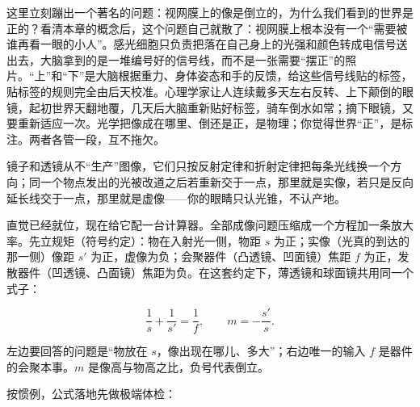\begin{mainline}
这里立刻蹦出一个著名的问题：视网膜上的像是倒立的，为什么我们看到的世界是正的？看清本章的概念后，这个问题自己就散了：视网膜上根本没有一个“需要被谁再看一眼的小人”。感光细胞只负责把落在自己身上的光强和颜色转成电信号送出去，大脑拿到的是一堆编号好的信号线，而不是一张需要“摆正”的照片。“上”和“下”是大脑根据重力、身体姿态和手的反馈，给这些信号线贴的标签，贴标签的规则完全由后天校准。心理学家让人连续戴多天左右反转、上下颠倒的眼镜，起初世界天翻地覆，几天后大脑重新贴好标签，骑车倒水如常；摘下眼镜，又要重新适应一次。光学把像成在哪里、倒还是正，是物理；你觉得世界“正”，是标注。两者各管一段，互不拖欠。

\end{mainline}

\begin{mainline}


\begin{oneline}
镜子和透镜从不“生产”图像，它们只按反射定律和折射定律把每条光线换一个方向；同一个物点发出的光被改道之后若重新交于一点，那里就是实像，若只是反向延长线交于一点，那里就是虚像——你的眼睛只认光锥，不认产地。
\end{oneline}


直觉已经就位，现在给它配一台计算器。全部成像问题压缩成一个方程加一条放大率。先立规矩（符号约定）：物在入射光一侧，物距 $s$ 为正；实像（光真的到达的那一侧）像距 $s'$ 为正，虚像为负；会聚器件（凸透镜、凹面镜）焦距 $f$ 为正，发散器件（凹透镜、凸面镜）焦距为负。在这套约定下，薄透镜和球面镜共用同一个式子：

\[
\frac{1}{s}+\frac{1}{s'}=\frac{1}{f},
\qquad
m=-\frac{s'}{s}.
\]

左边要回答的问题是“物放在 $s$，像出现在哪儿、多大”；右边唯一的输入 $f$ 是器件的会聚本事。$m$ 是像高与物高之比，负号代表倒立。

按惯例，公式落地先做极端体检：


\end{mainline}
